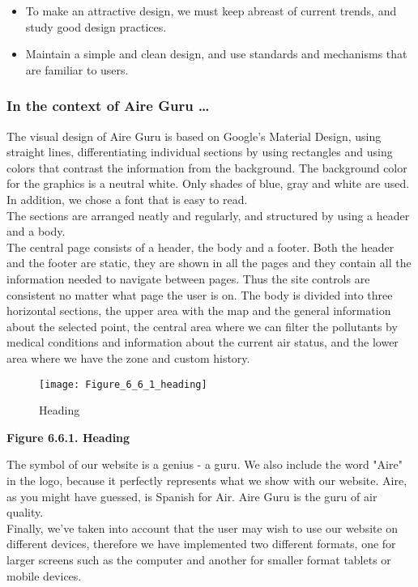 \begin{itemize}
    \item To make an attractive design, we must keep abreast of current trends, and study good design practices.
    \item Maintain a simple and clean design, and use standards and mechanisms that are familiar to users.
\end{itemize}

\subsubsection*{In the context of Aire Guru \ldots}

The visual design of Aire Guru is based on Google's Material Design, using straight lines, differentiating individual sections by using rectangles
and using colors that contrast the information from the background.
The background color for the graphics is a neutral white.
Only shades of blue, gray and white are used. In addition, we chose a font that is easy to read.\\

The sections are arranged neatly and regularly, and structured by using a header and a body.\\

The central page consists of a header, the body and a footer. Both the header and the footer are static,
they are shown in all the pages and they contain all the information needed to navigate between pages. Thus the site controls are consistent no matter what page the user is on.
The body is divided into three horizontal sections, the upper area with the map and the general information about the selected point,
the central area where we can filter the pollutants by medical conditions and information about the current air status, and the
lower area where we have the zone and custom history.\\

\begin{figure}[ht]
    \centering
    \texttt{[image: Figure\_6\_6\_1\_heading]}
    \caption{Heading}
\end{figure}

\begin{center}
    \bf{     
    Figure 6.6.1. Heading}
  \end{center} 
 
The symbol of our website is a genius - a guru. We also include the word "Aire" in the logo, because it perfectly represents 
what we show with our website. Aire, as you might have guessed, is Spanish for Air. Aire Guru is the guru of air quality. \\

Finally, we've taken into account that the user may wish to use our website on different devices, therefore we have implemented
two different formats, one for larger screens such as the computer and another for smaller format tablets or mobile devices.